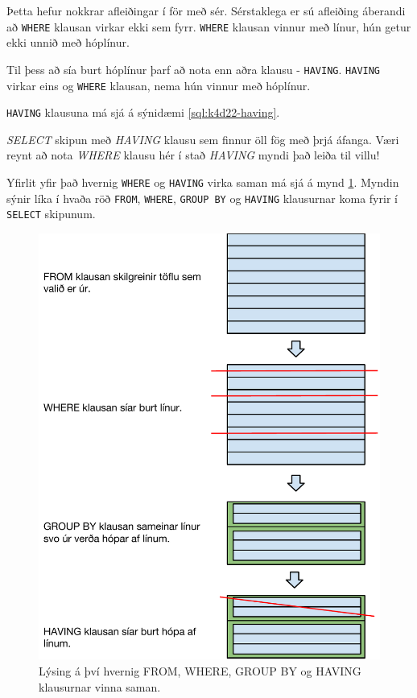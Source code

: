 Þetta hefur nokkrar afleiðingar í för með sér. Sérstaklega er sú afleiðing áberandi að \verb|WHERE| klausan virkar ekki sem fyrr. \verb|WHERE| klausan vinnur með línur, hún getur ekki unnið með hóplínur.

Til þess að sía burt hóplínur þarf að nota enn aðra klausu - \verb|HAVING|. \verb|HAVING| virkar eins og \verb|WHERE| klausan, nema hún vinnur með hóplínur. 

\verb|HAVING| klausuna má sjá á sýnidæmi \ref{sql:k4d22-having}.

\begin{example}
\caption[HAVING]{\emph{SELECT} skipun með \emph{HAVING} klausu sem finnur öll fög með þrjá áfanga. Væri reynt að nota \emph{WHERE} klausu hér í stað \emph{HAVING} myndi það leiða til villu!}
\label{sql:k4d22-having}
\centering
{}
\end{example}

Yfirlit yfir það hvernig \verb|WHERE| og \verb|HAVING| virka saman má sjá á mynd \ref{mynd:group-by-having}. Myndin sýnir líka í hvaða röð \verb|FROM|, \verb|WHERE|, \verb|GROUP BY| og \verb|HAVING| klausurnar koma fyrir í \verb|SELECT| skipunum.
\begin{figure}
\caption[FROM, WHERE, GROUP BY og HAVING]{Lýsing á því hvernig FROM, WHERE, GROUP BY og HAVING klausurnar vinna saman.}
\label{mynd:group-by-having}
\centering
\includegraphics[width=\linewidth]{myndir/group-by-having}
\end{figure}

